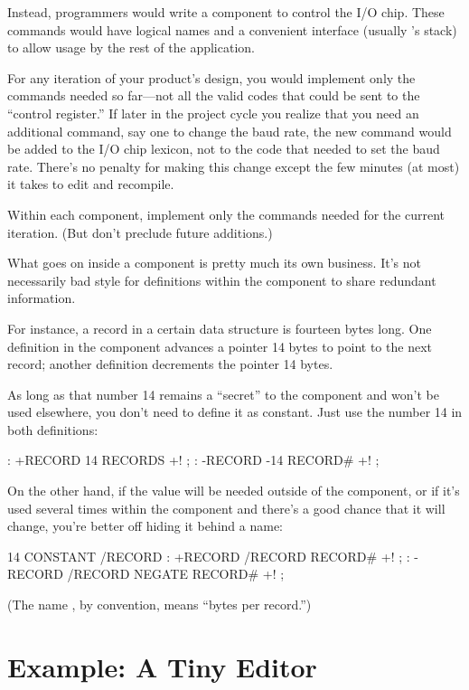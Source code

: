 Instead, \Forth{} programmers would write a component to control the I/O
chip. These commands would have logical names and a convenient
interface (usually \Forth{}'s stack) to allow usage by the rest of the
application.

For any iteration of your product's design, you would implement only
the commands needed so far---not all the valid codes that could be
sent to the ``control register.'' If later in the project cycle you
realize that you need an additional command, say one to change the
baud rate, the new command would be added to the I/O chip lexicon, not
to the code that needed to set the baud rate. There's no penalty for
making this change except the few minutes (at most) it takes to edit
and recompile.

\begin{tip}
Within each component, implement only the commands needed for the
current iteration. (But don't preclude future additions.)
\end{tip}
What goes on inside a component is pretty much its own business. It's
not necessarily bad style for definitions within the component to share
redundant information.

For instance, a record in a certain data structure is fourteen bytes
long. One definition in the component advances a pointer 14 bytes to
point to the next record; another definition decrements the pointer 14
bytes.

As long as that number 14 remains a ``secret'' to the component and
won't be used elsewhere, you don't need to define it as constant. Just use
the number 14 in both definitions:

\begin{Code}
: +RECORD 14 RECORDS +! ;
: -RECORD -14 RECORD# +! ;
\end{Code}
On the other hand, if the value will be needed outside of the component,
or if it's used several times within the component and there's a good
chance that it will change, you're better off hiding it behind a name:

\begin{Code}
14 CONSTANT /RECORD
: +RECORD /RECORD RECORD# +! ;
: -RECORD /RECORD NEGATE RECORD# +! ;
\end{Code}
(The name , by convention, means ``bytes per record.'')

\section{Example: A Tiny Editor}\label{editor1}

